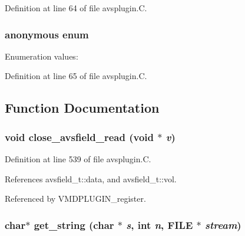 Definition at line 64 of file avsplugin.C.\subsubsection{\setlength{\rightskip}{0pt plus 5cm}anonymous enum}\label{avsplugin_8C_a21}


\begin{Desc}
\item[Enumeration values:]\par
\begin{description}
\item[{\em 
{\em AVSFLOAT}\label{avsplugin_8C_a21a9}
}]\end{description}
\end{Desc}



Definition at line 65 of file avsplugin.C.

\subsection{Function Documentation}
\subsubsection{\setlength{\rightskip}{0pt plus 5cm}void close\_\-avsfield\_\-read (void $\ast$ {\em v})\hspace{0.3cm}{\tt  [static]}}\label{avsplugin_8C_a15}




Definition at line 539 of file avsplugin.C.

References avsfield\_\-t::data, and avsfield\_\-t::vol.

Referenced by VMDPLUGIN\_\-register.
\subsubsection{\setlength{\rightskip}{0pt plus 5cm}char$\ast$ get\_\-string (char $\ast$ {\em s}, int {\em n}, FILE $\ast$ {\em stream})\hspace{0.3cm}{\tt  [static]}}\label{avsplugin_8C_a10}




